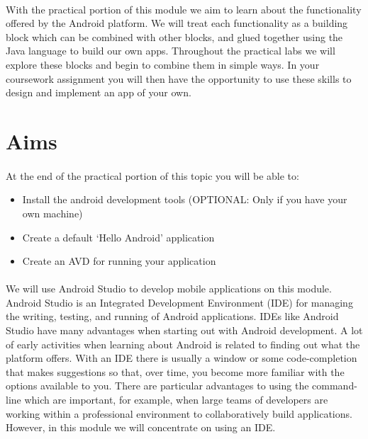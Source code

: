 \documentclass[12pt, a4paper, twoside]{book}
\begin{document}
\paragraph{} With the practical portion of this module we aim to learn about the functionality offered by the Android platform. We will treat each functionality as a building block which can be combined with other blocks, and glued together using the Java language to build our own apps. Throughout the practical labs we will explore these blocks and begin to combine them in simple ways. In your coursework assignment you will then have the opportunity to use these skills to design and implement an app of your own.

\section{Aims}
\paragraph{} At the end of the practical portion of this topic you will be able to:

\begin{itemize}
\item Install the android development tools (OPTIONAL: Only if you have your own machine)
\item Create a default `Hello Android' application
\item Create an AVD for running your application
\end{itemize}

\paragraph{} We will use Android Studio to develop mobile applications on this module. Android Studio is an Integrated Development Environment (IDE) for managing the writing, testing, and running of Android applications. IDEs like Android Studio have many advantages when starting out with Android development. A lot of early activities when learning about Android is related to finding out what the platform offers. With an IDE there is usually a window or some code-completion that makes suggestions so that, over time, you become more familiar with the options available to you. There are particular advantages to using the command-line which are important, for example, when large teams of developers are working within a professional environment to collaboratively build applications. However, in this module we will concentrate on using an IDE.
\end{document}
